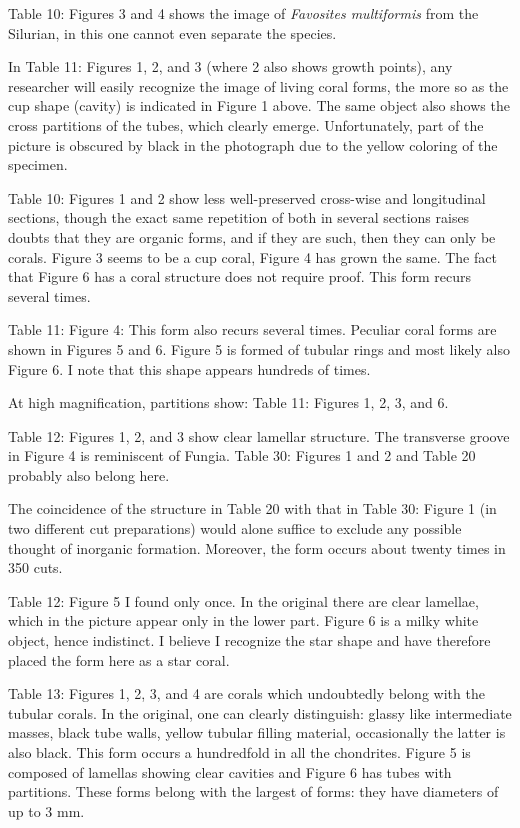 \documentclass[a4paper, 12pt, oneside]{article}
\begin{document}
Table 10: Figures 3 and 4 shows the image of \emph{Favosites multiformis} from the Silurian, in this one cannot even separate the species.

In Table 11: Figures 1, 2, and 3 (where 2 also shows growth points), any researcher will easily recognize the image of living coral forms, the more so as the cup shape (cavity) is indicated in Figure 1 above. The same object also shows the cross partitions of the tubes, which clearly emerge. Unfortunately, part of the picture is obscured by black in the photograph due to the yellow coloring of the specimen.

Table 10: Figures 1 and 2 show less well-preserved cross-wise and longitudinal sections, though the exact same repetition of both in several sections raises doubts that they are organic forms, and if they are such, then they can only be corals. Figure 3 seems to be a cup coral, Figure 4 has grown the same. The fact that Figure 6 has a coral structure does not require proof. This form recurs several times.

Table 11: Figure 4: This form also recurs several times. Peculiar coral forms are shown in Figures 5 and 6. Figure 5 is formed of tubular rings and most likely also Figure 6. I note that this shape appears hundreds of times.

At high magnification, partitions show: Table 11: Figures 1, 2, 3, and 6.

Table 12: Figures 1, 2, and 3 show clear lamellar structure. The transverse groove in Figure 4 is reminiscent of Fungia. Table 30: Figures 1 and 2 and Table 20 probably also belong here.

The coincidence of the structure in Table 20 with that in Table 30: Figure 1 (in two different cut preparations) would alone suffice to exclude any possible thought of inorganic formation. Moreover, the form occurs about twenty times in 350 cuts.

Table 12: Figure 5 I found only once. In the original there are clear lamellae, which in the picture appear only in the lower part. Figure 6 is a milky white object, hence indistinct. I believe I recognize the star shape and have therefore placed the form here as a star coral.

Table 13: Figures 1, 2, 3, and 4 are corals which undoubtedly belong with the tubular corals. In the original, one can clearly distinguish: glassy like intermediate masses, black tube walls, yellow tubular filling material, occasionally the latter is also black. This form occurs a hundredfold in all the chondrites. Figure 5 is composed of lamellas showing clear cavities and Figure 6 has tubes with partitions. These forms belong with the largest of forms: they have diameters of up to 3 mm.
\end{document}
